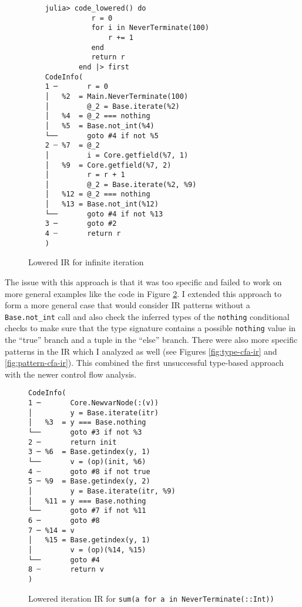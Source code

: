 \documentclass[manuscript, nonacm]{acmart}
\begin{document}
\begin{figure}
    \begin{verbatim}
    julia> code_lowered() do
               r = 0
               for i in NeverTerminate(100)
                   r += 1
               end
               return r
            end |> first
    CodeInfo(
    1 ─       r = 0
    │   %2  = Main.NeverTerminate(100)
    │         @_2 = Base.iterate(%2)
    │   %4  = @_2 === nothing
    │   %5  = Base.not_int(%4)
    └──       goto #4 if not %5
    2 ┄ %7  = @_2
    │         i = Core.getfield(%7, 1)
    │   %9  = Core.getfield(%7, 2)
    │         r = r + 1
    │         @_2 = Base.iterate(%2, %9)
    │   %12 = @_2 === nothing
    │   %13 = Base.not_int(%12)
    └──       goto #4 if not %13
    3 ─       goto #2
    4 ┄       return r
    )
    \end{verbatim}
    \caption{Lowered IR for infinite iteration}
    \label{fig:infiter-ir}
\end{figure}

The issue with this approach is that it was too specific and failed to work on more general examples like the code in Figure \ref{fig:sum-ir}. I extended this approach to form a more general case that would consider IR patterns without a \verb|Base.not_int| call and also check the inferred types of the \texttt{nothing} conditional checks to make sure that the type signature contains a possible \texttt{nothing} value in the ``true'' branch and a tuple in the ``else'' branch. There were also more specific patterns in the IR which I analyzed as well (see Figures \ref{fig:type-cfa-ir} and \ref{fig:pattern-cfa-ir}). This combined the first unsuccessful type-based approach with the newer control flow analysis.

\begin{figure}
    \begin{verbatim}
CodeInfo(
1 ─       Core.NewvarNode(:(v))
│         y = Base.iterate(itr)
│   %3  = y === Base.nothing
└──       goto #3 if not %3
2 ─       return init
3 ─ %6  = Base.getindex(y, 1)
└──       v = (op)(init, %6)
4 ┄       goto #8 if not true
5 ─ %9  = Base.getindex(y, 2)
│         y = Base.iterate(itr, %9)
│   %11 = y === Base.nothing
└──       goto #7 if not %11
6 ─       goto #8
7 ─ %14 = v
│   %15 = Base.getindex(y, 1)
│         v = (op)(%14, %15)
└──       goto #4
8 ┄       return v
)
    \end{verbatim}
    \caption{Lowered iteration IR for \texttt{sum(a for a in NeverTerminate(::Int))}}
    \label{fig:sum-ir}
\end{figure}
\end{document}
